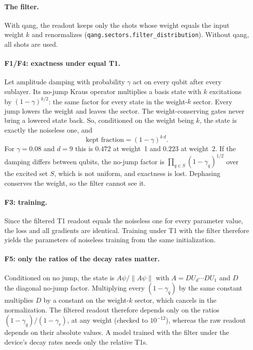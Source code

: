 \documentclass[11pt]{article}
\begin{document}
\paragraph{The filter.} With qang, the readout keeps only the shots whose weight equals the input weight $k$
and renormalizes (\texttt{qang.sectors.filter\_distribution}). Without qang, all shots are used.

\paragraph{F1/F4: exactness under equal T1.} Let amplitude damping with probability $\gamma$ act on every
qubit after every sublayer. Its no-jump Kraus operator multiplies a basis state with $k$ excitations by
$(1-\gamma)^{k/2}$: the same factor for every state in the weight-$k$ sector. Every jump lowers the weight
and leaves the sector. The weight-conserving gates never bring a lowered state back. So, conditioned on the
weight being $k$, the state is exactly the noiseless one, and
\begin{equation}
  \text{kept fraction}=(1-\gamma)^{k\,d}.
\end{equation}
For $\gamma=0.08$ and $d=9$ this is $0.472$ at weight~1 and $0.223$ at weight~2. If the damping differs
between qubits, the no-jump factor is $\prod_{q\in S}(1-\gamma_q)^{1/2}$ over the excited set $S$, which is
not uniform, and exactness is lost. Dephasing conserves the weight, so the filter cannot see it.

\paragraph{F3: training.} Since the filtered T1 readout equals the noiseless one for every parameter value,
the loss and all gradients are identical. Training under T1 with the filter therefore yields the parameters
of noiseless training from the same initialization.

\paragraph{F5: only the ratios of the decay rates matter.} Conditioned on no jump, the state is
$A\psi/\|A\psi\|$ with $A=DU_d\cdots DU_1$ and $D$ the diagonal no-jump factor. Multiplying every $(1-\gamma_q)$ by
the same constant multiplies $D$ by a constant on the weight-$k$ sector, which cancels in the normalization. The
filtered readout therefore depends only on the ratios $(1-\gamma_q)/(1-\gamma_r)$, at any weight (checked to
$10^{-12}$), whereas the raw readout depends on their absolute values. A model trained with the filter under the
device's decay rates needs only the relative T1s.
\end{document}

